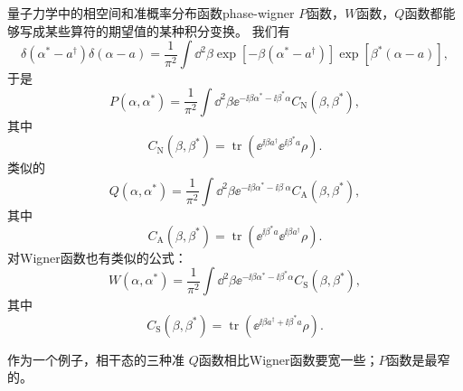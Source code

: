 \begin{back}{量子力学中的相空间和准概率分布函数}{phase-wigner}
    $P$函数，$W$函数，$Q$函数都能够写成某些算符的期望值的某种积分变换。
    我们有
    \begin{equation}
        \delta\left(\alpha^{*}-a^{\dagger}\right) \delta(\alpha-a) =\frac{1}{\pi^{2}} \int \dd^{2} \beta \exp \left[-\beta\left(\alpha^{*}-a^{\dagger}\right)\right] \exp \left[\beta^{*}(\alpha-a)\right],
    \end{equation}
    于是
    \begin{equation}
        P\left(\alpha, \alpha^{*}\right)=\frac{1}{\pi^{2}} \int \dd^{2} \beta \ee^{- \ii \beta \alpha^{*}- \ii \beta^{*} \alpha} C_\text{N}\left(\beta, \beta^{*}\right),
    \end{equation}
    其中
    \begin{equation}
        C_\text{N}\left(\beta, \beta^{*}\right)=\operatorname{tr}\left(\ee^{\ii \beta a^{\dagger}} \ee^{\ii \beta^{*} a} \rho\right).
    \end{equation}
    类似的
    \begin{equation}
        Q\left(\alpha, \alpha^{*}\right)=\frac{1}{\pi^{2}} \int \dd^{2} \beta \ee^{- \ii \beta \alpha^{*}- \ii \beta^{\cdot} \alpha} C_\text{A}\left(\beta, \beta^{*}\right),
    \end{equation}
    其中
    \begin{equation}
        C_\text{A}\left(\beta, \beta^{*}\right)=\operatorname{tr}\left(\ee^{\ii \beta^{*} a} \ee^{\ii \beta a^{\dagger}} \rho\right).
    \end{equation}
    对Wigner函数也有类似的公式：
    \begin{equation}
        W\left(\alpha, \alpha^{*}\right)=\frac{1}{\pi^{2}} \int \dd^{2} \beta \ee^{-\ii \beta \alpha^{*}- \ii \beta^{*} \alpha} C_\text{S}\left(\beta, \beta^{*}\right),
    \end{equation}
    其中
    \begin{equation}
        C_\text{S}\left(\beta, \beta^{*}\right)=\operatorname{tr}\left(\ee^{\ii \beta a^{\dagger}+ \ii \beta^{*} a} \rho\right).
    \end{equation}

    作为一个例子，相干态的三种准
    $Q$函数相比Wigner函数要宽一些；$P$函数是最窄的。
\end{back}